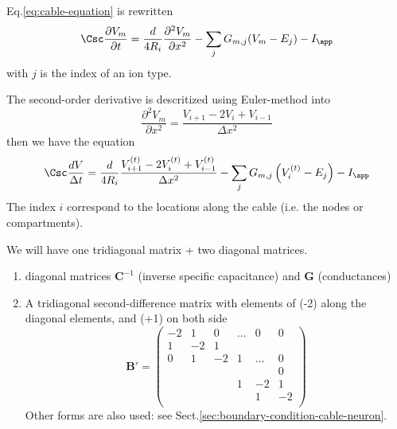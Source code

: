 Eq.\ref{eq:cable-equation} is rewritten
\begin{equation}
  \Csc \frac{\partial V_m}{\partial t} = \frac{d}{4R_i} \frac{\partial
  ^2V_m}{\partial x^2} - \sum_j G_{m,j} (V_m - E_j)  - I_\app
\end{equation}
with $j$ is the index of an ion type.

The second-order derivative is descritized using Euler-method into
\begin{equation}
\frac{\partial
  ^2V_m}{\partial x^2} = \frac{V_{i+1} - 2V_i + V_{i-1}}{\Delta x^2}
\end{equation}
then we have the equation 
\begin{equation}
  \Csc \frac{dV}{\Delta t} = \frac{d}{4R_i}
  \frac{V_{i+1}^{(t)} - 2V_i^{(t)} + V_{i-1}^{(t)}}{\Delta x^2} - \sum_j G_{m,j}
 \left( V_{i}^{(t)} - E_j \right)    - I_\app
\end{equation}
The index $i$ correspond to the locations along the cable (i.e. the nodes or
compartments). 

We will have one tridiagonal matrix + two diagonal matrices.
\begin{enumerate}
  \item diagonal matrices $\mathbf{C}^{-1}$ (inverse specific capacitance) and
  $\mathbf{G}$ (conductances)
  
  \item 
  A tridiagonal second-difference matrix with elements of (-2) along the diagonal
elements, and (+1) on both side
\begin{equation}
\mathbf{B'} = \left( 
\begin{array}{cccccc}
-2 &  1 & 0  & \ldots & 0 & 0 \\
1  & -2 & 1  &   &    & \\
0  &  1 & -2 & 1 & \ldots & 0\\
   &    &    &   &        & 0\\
   &    &    & 1 & -2 & 1 \\
   &    &    &   & 1 & -2 \\ 
\end{array}
\right)
\end{equation}
Other forms are also used: see Sect.\ref{sec:boundary-condition-cable-neuron}.
  
\end{enumerate}

